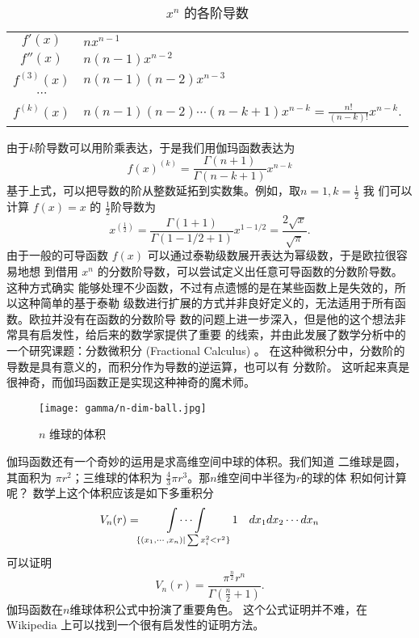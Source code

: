 \begin{table}[H]
\centering
\caption{$x^n$ 的各阶导数}
\begin{tabular*}{0.8\textwidth}{@{\extracolsep{\fill}}cl}
\\
$f'(x)$ & $nx^{n-1}$ \\
$f''(x)$ & $n(n-1)x^{n-2}$ \\
$f^{(3)}(x)$ & $n(n-1)(n-2)x^{n-3}$ \\
$\cdots$ &  \\
$f^{(k)}(x)$ & $n(n-1)(n-2)\cdots(n-k+1)x^{n-k} = \frac{n!}{(n-k)!} x^{n-k}$. 
\end{tabular*}
\end{table}

由于$k$阶导数可以用阶乘表达，于是我们用伽玛函数表达为
$$ f(x)^{(k)} = \frac{\Gamma{(n+1)}}{\Gamma{(n-k+1)}} x^{n-k} $$
基于上式，可以把导数的阶从整数延拓到实数集。例如，取$n=1, k=\frac{1}{2}$ 我
们可以计算 $f(x)=x$ 的 $\frac{1}{2}$阶导数为
$$ x^{(\frac{1}{2})} = \frac{\Gamma{(1+1)}}{\Gamma{(1-1/2+1)}} x^{1-1/2} 
= \frac{2\sqrt{x}}{\sqrt{\pi}} .$$
由于一般的可导函数 $f(x)$ 可以通过泰勒级数展开表达为幂级数，于是欧拉很容易地想
到借用 $x^n$ 的分数阶导数，可以尝试定义出任意可导函数的分数阶导数。这种方式确实
能够处理不少函数，不过有点遗憾的是在某些函数上是失效的，所以这种简单的基于泰勒
级数进行扩展的方式并非良好定义的，无法适用于所有函数。欧拉并没有在函数的分数阶导
数的问题上进一步深入，但是他的这个想法非常具有启发性，给后来的数学家提供了重要
的线索，并由此发展了数学分析中的一个研究课题：分数微积分 (Fractional Calculus)
。 在这种微积分中，分数阶的导数是具有意义的，而积分作为导数的逆运算，也可以有
分数阶。 这听起来真是很神奇，而伽玛函数正是实现这种神奇的魔术师。

\begin{figure}[htbp]
\centering
\texttt{[image: gamma/n-dim-ball.jpg]}
\caption{$n$ 维球的体积}
\end{figure}

伽玛函数还有一个奇妙的运用是求高维空间中球的体积。我们知道 二维球是圆，其面积为
$\pi r^2$；三维球的体积为 $\frac{4}{3} \pi r^3$。那$n$维空间中半径为$r$的球的体
积如何计算呢？ 数学上这个体积应该是如下多重积分
$$ \displaystyle V_n(r) = \idotsint\limits_{ \tiny \{(x_1, \cdots, x_n) | \sum x_i^2 < r^2 \} }  1 \quad dx_1dx_2 \cdots dx_n  $$
可以证明
$$ V_n(r) = \frac{\pi^{\frac{n}{2}} r^n}{\Gamma(\frac{n}{2} + 1)} .$$ 
伽玛函数在$n$维球体积公式中扮演了重要角色。 这个公式证明并不难，在 Wikipedia 上可以找到一个很有启发性的证明方法。

